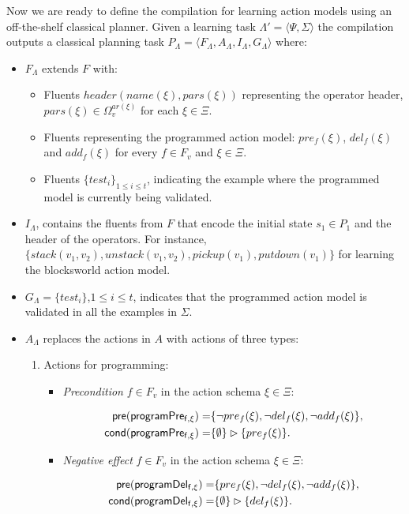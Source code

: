 \documentclass[letterpaper]{article} %
\newcommand{\tup}[1]{{\langle #1 \rangle}}
\newcommand{\pre}{\mathsf{pre}}     %
\newcommand{\cond}{\mathsf{cond}}   %
\begin{document}
Now we are ready to define the compilation for learning action models using an off-the-shelf classical planner. Given a learning task $\Lambda'=\tup{\Psi,\Sigma}$ the compilation outputs a classical planning task $P_{\Lambda}=\tup{F_{\Lambda},A_{\Lambda},I_{\Lambda},G_{\Lambda}}$ where:
\begin{itemize}
\item $F_{\Lambda}$ extends $F$ with:
\begin{itemize}
\item Fluents $header(name(\xi),pars(\xi))$ representing the operator header, $pars(\xi)\in\Omega_v^{ar(\xi)}$ for each $\xi \in \Xi$. 
\item Fluents representing the programmed action model: $pre_f(\xi)$, $del_f(\xi)$ and $add_f(\xi)$ for every $f\in F_v$ and $\xi \in \Xi$.
\item Fluents $\{test_i\}_{1\leq i\leq t}$, indicating the example where the programmed model is currently being validated.
\end{itemize}
\item $I_{\Lambda}$, contains the fluents from $F$ that encode the initial state $s_1\in P_1$ and the header of the operators. For instance, {\small $\{stack(v_1,v_2), unstack(v_1,v_2), pickup(v_1), putdown(v_1)\}$} for learning the blocksworld action model.
\item $G_{\Lambda}=\{test_i\}$,{\small $1\leq i\leq t$}, indicates that the programmed action model is validated in all the examples in $\Sigma$.
\item $A_{\Lambda}$ replaces the actions in $A$ with actions of three types:
\begin{enumerate}
\item Actions for programming:

\begin{itemize}
\item {\em Precondition} $f\in F_v$ in the action schema $\xi\in\Xi$:
\begin{small}
\begin{align*}
\hspace*{7pt}\pre(\mathsf{programPre_{f,\xi}})=&\{\neg pre_{f}(\xi),\neg del_{f}(\xi),\neg add_{f}(\xi)\},\\    
\cond(\mathsf{programPre_{f,\xi}})=&\{\emptyset\}\rhd\{pre_{f}(\xi)\}.
\end{align*}
\end{small}

\item {\em Negative effect} $f\in F_v$ in the action schema $\xi\in\Xi$:
\begin{small}
\begin{align*}
\hspace*{7pt}\pre(\mathsf{programDel_{f,\xi}})=&\{pre_{f}(\xi),\neg del_{f}(\xi),\neg add_{f}(\xi)\},\\                                                   
\cond(\mathsf{programDel_{f,\xi}})=&\{\emptyset\}\rhd\{del_{f}(\xi)\}.
\end{align*}
\end{small}


\end{itemize}
\end{enumerate}
\end{itemize}
\end{document}

